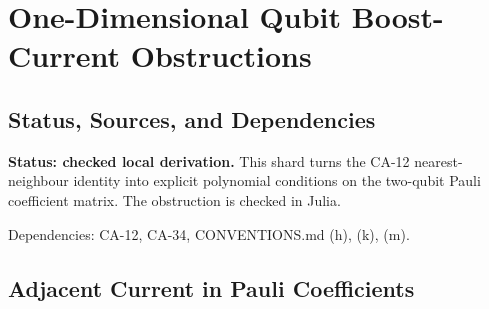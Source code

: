 
\section{One-Dimensional Qubit Boost-Current Obstructions}
\label{sec:qubit-1d-boost-current-obstructions}

\subsection{Status, Sources, and Dependencies}

\textbf{Status: checked local derivation.}  This shard turns the CA-12
nearest-neighbour identity into explicit polynomial conditions on the
two-qubit Pauli coefficient matrix.  The obstruction is checked in Julia.

Dependencies: CA-12, CA-34, CONVENTIONS.md (h), (k), (m).


\subsection{Adjacent Current in Pauli Coefficients}

